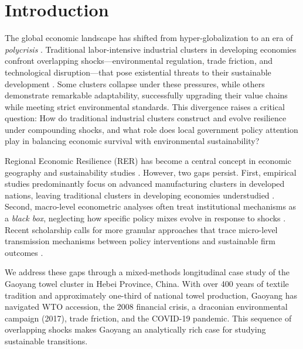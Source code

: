 \documentclass[sustainability,article,submit,moreauthors,pdftex]{mdpi}
\begin{document}
\section{Introduction}\label{sec:intro}

The global economic landscape has shifted from hyper-globalization to an era of \emph{polycrisis} \citep{Tooze2021}. Traditional labor-intensive industrial clusters in developing economies confront overlapping shocks---environmental regulation, trade friction, and technological disruption---that pose existential threats to their sustainable development \citep{Gong2022, Zhou2017}. Some clusters collapse under these pressures, while others demonstrate remarkable adaptability, successfully upgrading their value chains while meeting strict environmental standards. This divergence raises a critical question: How do traditional industrial clusters construct and evolve resilience under compounding shocks, and what role does local government policy attention play in balancing economic survival with environmental sustainability?

Regional Economic Resilience (RER) has become a central concept in economic geography and sustainability studies \citep{Martin2012, Boschma2015, Martin2015}. However, two gaps persist. First, empirical studies predominantly focus on advanced manufacturing clusters in developed nations, leaving traditional clusters in developing economies understudied \citep{Zhu2022}. Second, macro-level econometric analyses often treat institutional mechanisms as a \emph{black box}, neglecting how specific policy mixes evolve in response to shocks \citep{Grillitsch2020, Hassink2019}. Recent scholarship calls for more granular approaches that trace micro-level transmission mechanisms between policy interventions and sustainable firm outcomes \citep{RodriguezPose2013, HuHassink2017}.

We address these gaps through a mixed-methods longitudinal case study \citep{Creswell2017} of the Gaoyang towel cluster in Hebei Province, China. With over 400 years of textile tradition and approximately one-third of national towel production, Gaoyang has navigated WTO accession, the 2008 financial crisis, a draconian environmental campaign (2017), trade friction, and the COVID-19 pandemic. This sequence of overlapping shocks makes Gaoyang an analytically rich case for studying sustainable transitions.
\end{document}
